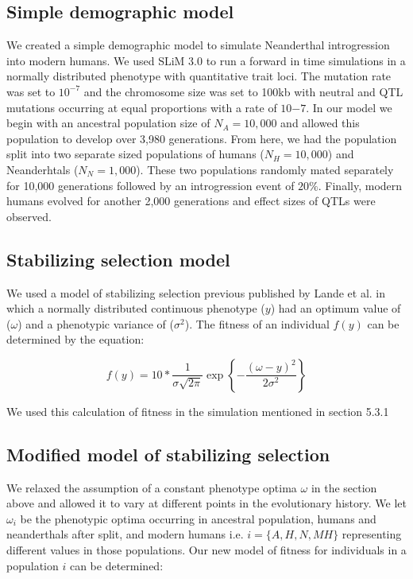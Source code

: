 \subsection{Simple demographic model}
We created a simple demographic model to simulate Neanderthal introgression into modern humans. We used SLiM 3.0 \cite{haller2019slim} to run a forward in time simulations in a normally distributed phenotype with quantitative trait loci. The mutation rate was set to $10^{-7}$ and the chromosome size was set to 100kb with neutral and QTL mutations occurring at equal proportions with a rate of $10{-7}$. In our model we begin with an ancestral population size of $N_A = 10,000$ and allowed this population to develop over 3,980 generations. From here, we had the population split into two separate sized populations of humans ($N_H = 10,000$) and Neanderhtals ($N_N = 1,000$). These two populations randomly mated separately for 10,000 generations followed by an introgression event of $20\%$. Finally, modern humans evolved for another 2,000 generations and effect sizes of QTLs were observed. 

\subsection{Stabilizing selection model}
We used a model of stabilizing selection previous published by Lande et al.\cite{lande1976natural} in which a normally distributed continuous phenotype ($y$) had an optimum value of ($\omega$) and a phenotypic variance of ($\sigma^2$). The fitness of an individual $f(y)$ can be determined by the equation:

$$f(y) = 10 * \frac{1}{\sigma\sqrt{2\pi}} \exp{\left\{ -\frac{(\omega-y)^2}{2\sigma^2}\right \}}$$

We used this calculation of fitness in the simulation mentioned in section 5.3.1

\subsection{Modified model of stabilizing selection}
We relaxed the assumption of a constant phenotype optima $\omega$ in the section above and allowed it to vary at different points in the evolutionary history. We let $\omega_i$ be the phenotypic optima occurring in ancestral population, humans and neanderthals after split, and modern humans i.e. $i=\{A,H,N,MH\}$ representing different values in those populations. Our new model of fitness for individuals in a population $i$ can be determined: 

